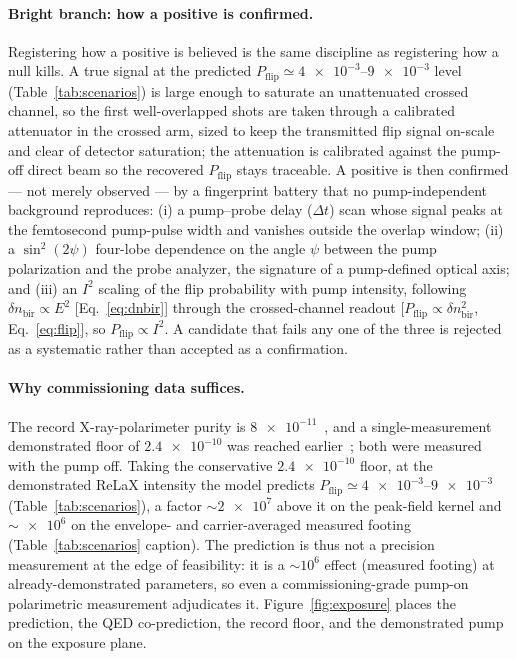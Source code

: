 \documentclass[aps,prd,twocolumn,superscriptaddress,nofootinbib,longbibliography]{revtex4-2}
\newcommand{\dnbir}{\delta n_{\mathrm{bir}}}
\newcommand{\Pflip}{P_{\mathrm{flip}}}
\begin{document}
\paragraph*{Bright branch: how a positive is confirmed.}
Registering how a positive is believed is the same discipline as registering how a
null kills. A true signal at the predicted $\Pflip\simeq\numrange{4e-3}{9e-3}$ level
(Table~\ref{tab:scenarios}) is large enough to saturate an unattenuated crossed
channel, so the first well-overlapped shots are taken through a calibrated attenuator
in the crossed arm, sized to keep the transmitted flip signal on-scale and clear of
detector saturation; the attenuation is calibrated against the pump-off direct beam
so the recovered $\Pflip$ stays traceable. A positive is then confirmed --- not
merely observed --- by a fingerprint battery that no pump-independent background
reproduces: (i) a pump--probe delay ($\Delta t$) scan whose signal peaks at the
femtosecond pump-pulse width and vanishes outside the overlap window; (ii) a
$\sin^2(2\psi)$ four-lobe dependence on the angle $\psi$ between the pump
polarization and the probe analyzer, the signature of a pump-defined optical axis;
and (iii) an $I^2$ scaling of the flip probability with pump intensity, following
$\dnbir\propto E^2$ [Eq.~\eqref{eq:dnbir}] through the crossed-channel readout
[$\Pflip\propto\dnbir^2$, Eq.~\eqref{eq:flip}], so $\Pflip\propto I^2$. A candidate
that fails any one of the three is rejected as a systematic rather than accepted as a
confirmation.

\paragraph*{Why commissioning data suffices.}
The record X-ray-polarimeter purity is $\num{8e-11}$~\cite{Karbstein2021}, and a
single-measurement demonstrated floor of $\num{2.4e-10}$ was reached
earlier~\cite{Marx2013}; both were measured with the pump off. Taking the
conservative $\num{2.4e-10}$ floor, at the demonstrated ReLaX intensity the model
predicts $\Pflip\simeq\numrange{4e-3}{9e-3}$ (Table~\ref{tab:scenarios}), a factor
$\sim\!\num{2e7}$ above it on the peak-field kernel and $\sim\!\num{e6}$ on the
envelope- and carrier-averaged measured footing (Table~\ref{tab:scenarios}
caption). The prediction is thus not a precision measurement at
the edge of feasibility: it is a $\sim\!10^6$ effect (measured footing) at
already-demonstrated parameters, so even a commissioning-grade pump-on
polarimetric measurement adjudicates it. Figure~\ref{fig:exposure} places the prediction, the QED
co-prediction, the record floor, and the demonstrated pump on the exposure plane.
\end{document}
